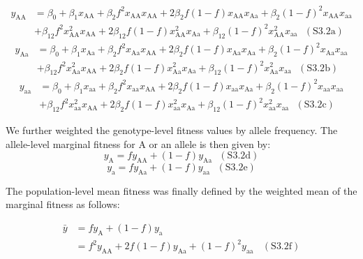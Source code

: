 \documentclass[12pt,]{article}
\begin{document}
\begin{equation*}
\begin{split}
y_\mathrm{AA} &= \beta_0 + \beta_1x_\mathrm{AA} + \beta_2f^2x_\mathrm{AA}x_\mathrm{AA} + 2\beta_2f(1-f)x_\mathrm{AA}x_\mathrm{Aa} + \beta_2(1-f)^2x_\mathrm{AA}x_\mathrm{aa} \\
& + \beta_{12}f^2x^2_\mathrm{AA}x_\mathrm{AA} + 2\beta_{12}f(1-f)x^2_\mathrm{AA}x_\mathrm{Aa}+ \beta_{12}(1-f)^2x^2_\mathrm{AA}x_\mathrm{aa}~~~(\mathrm{S3.2a})
\end{split}
\end{equation*}
\begin{equation*}
\begin{split}
y_\mathrm{Aa} &= \beta_0 + \beta_1x_\mathrm{Aa} + \beta_2f^2x_\mathrm{Aa}x_\mathrm{AA} + 2\beta_2f(1-f)x_\mathrm{Aa}x_\mathrm{Aa} + \beta_2(1-f)^2x_\mathrm{Aa}x_\mathrm{aa} \\
& + \beta_{12}f^2x^2_\mathrm{Aa}x_\mathrm{AA} + 2\beta_2f(1-f)x^2_\mathrm{Aa}x_\mathrm{Aa}+ \beta_{12}(1-f)^2x^2_\mathrm{Aa}x_\mathrm{aa}~~~(\mathrm{S3.2b})
\end{split}
\end{equation*}
\begin{equation*}
\begin{split}
y_\mathrm{aa} &= \beta_0 + \beta_1x_\mathrm{aa} + \beta_2f^2x_\mathrm{aa}x_\mathrm{AA} + 2\beta_2f(1-f)x_\mathrm{aa}x_\mathrm{Aa} + \beta_2(1-f)^2x_\mathrm{aa}x_\mathrm{aa} \\
& + \beta_{12}f^2 x^2_\mathrm{aa}x_\mathrm{AA} + 2\beta_2f(1-f)x^2_\mathrm{aa}x_\mathrm{Aa}+ \beta_{12}(1-f)^2x^2_\mathrm{aa}x_\mathrm{aa}~~~(\mathrm{S3.2c})
\end{split}
\end{equation*}

\noindent
We further weighted the genotype-level fitness values by allele frequency. The allele-level marginal fitness for A or an allele is then given by:
$$y_\mathrm{A} = fy_\mathrm{AA} + (1-f)y_\mathrm{Aa}~~~(\mathrm{S3.2d})$$
$$y_\mathrm{a} = fy_\mathrm{Aa} + (1-f)y_\mathrm{aa}~~~(\mathrm{S3.2e})$$

\noindent
The population-level mean fitness was finally defined by the weighted mean of the marginal fitness as follows:

\begin{equation*}
\begin{split}
\bar{y} &= fy_\mathrm{A} + (1-f)y_\mathrm{a} \\
&= f^2y_\mathrm{AA} + 2f(1-f)y_\mathrm{Aa} + (1-f)^2y_\mathrm{aa} ~~~~(\mathrm{S3.2f}) 
\end{split}
\end{equation*}
\end{document}
